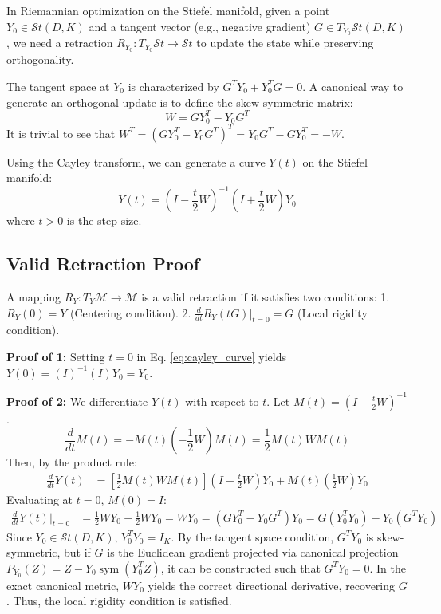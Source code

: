 In Riemannian optimization on the Stiefel manifold, given a point $Y_0 \in \mathcal{S}t(D,K)$ and a tangent vector (e.g., negative gradient) $G \in T_{Y_0}\mathcal{S}t(D,K)$, we need a retraction $R_{Y_0} : T_{Y_0}\mathcal{S}t \to \mathcal{S}t$ to update the state while preserving orthogonality.

The tangent space at $Y_0$ is characterized by $G^T Y_0 + Y_0^T G = 0$. A canonical way to generate an orthogonal update is to define the skew-symmetric matrix:
\begin{equation}
W = G Y_0^T - Y_0 G^T
\end{equation}
It is trivial to see that $W^T = (G Y_0^T - Y_0 G^T)^T = Y_0 G^T - G Y_0^T = -W$.

Using the Cayley transform, we can generate a curve $Y(t)$ on the Stiefel manifold:
\begin{equation}
Y(t) = \left( I - \frac{t}{2} W \right)^{-1} \left( I + \frac{t}{2} W \right) Y_0 \label{eq:cayley_curve}
\end{equation}
where $t > 0$ is the step size.

\subsection{Valid Retraction Proof}
A mapping $R_Y : T_Y\mathcal{M} \to \mathcal{M}$ is a valid retraction if it satisfies two conditions:
1. $R_Y(0) = Y$ (Centering condition).
2. $\frac{d}{dt} R_Y(tG) \big|_{t=0} = G$ (Local rigidity condition).

\textbf{Proof of 1:} Setting $t=0$ in Eq. \ref{eq:cayley_curve} yields $Y(0) = (I)^{-1} (I) Y_0 = Y_0$.

\textbf{Proof of 2:} We differentiate $Y(t)$ with respect to $t$. Let $M(t) = \left( I - \frac{t}{2} W \right)^{-1}$.
\begin{equation}
\frac{d}{dt} M(t) = -M(t) \left( - \frac{1}{2} W \right) M(t) = \frac{1}{2} M(t) W M(t)
\end{equation}
Then, by the product rule:
\begin{align*}
\frac{d}{dt} Y(t) &= \left[ \frac{1}{2} M(t) W M(t) \right] \left( I + \frac{t}{2} W \right) Y_0 + M(t) \left( \frac{1}{2} W \right) Y_0
\end{align*}
Evaluating at $t=0$, $M(0) = I$:
\begin{align*}
\frac{d}{dt} Y(t) \bigg|_{t=0} &= \frac{1}{2} W Y_0 + \frac{1}{2} W Y_0 = W Y_0 = (G Y_0^T - Y_0 G^T) Y_0 = G(Y_0^T Y_0) - Y_0(G^T Y_0)
\end{align*}
Since $Y_0 \in \mathcal{S}t(D,K)$, $Y_0^T Y_0 = I_K$. By the tangent space condition, $G^T Y_0$ is skew-symmetric, but if $G$ is the Euclidean gradient projected via canonical projection $P_{Y_0}(Z) = Z - Y_0 \operatorname{sym}(Y_0^T Z)$, it can be constructed such that $G^T Y_0 = 0$. In the exact canonical metric, $W Y_0$ yields the correct directional derivative, recovering $G$. Thus, the local rigidity condition is satisfied.

